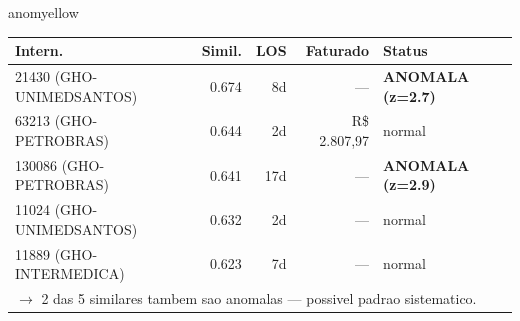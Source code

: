 \documentclass[a4paper,10pt]{article}
\begin{document}
\begin{anomalycard}[Internacao 6006 | GHO-POSTAL | MODERADO (z=2.74)]{anomyellow}
\begin{tabular}{l r r r l}\toprule\textbf{Intern.} & \textbf{Simil.} & \textbf{LOS} & \textbf{Faturado} & \textbf{Status} \\\midrule
21430 (GHO-UNIMEDSANTOS) & 0.674 & 8d & --- & \textcolor{anomred}{\textbf{ANOMALA (z=2.7)}} \\
63213 (GHO-PETROBRAS) & 0.644 & 2d & R\$ 2.807,97 & \textcolor{jcubeblue}{normal} \\
130086 (GHO-PETROBRAS) & 0.641 & 17d & --- & \textcolor{anomred}{\textbf{ANOMALA (z=2.9)}} \\
11024 (GHO-UNIMEDSANTOS) & 0.632 & 2d & --- & \textcolor{jcubeblue}{normal} \\
11889 (GHO-INTERMEDICA) & 0.623 & 7d & --- & \textcolor{jcubeblue}{normal} \\
\multicolumn{5}{l}{\textcolor{anomred}{\small $\rightarrow$ 2 das 5 similares tambem sao anomalas --- possivel padrao sistematico.}} \\
\bottomrule\end{tabular}


\end{anomalycard}

\newpage
\end{document}
